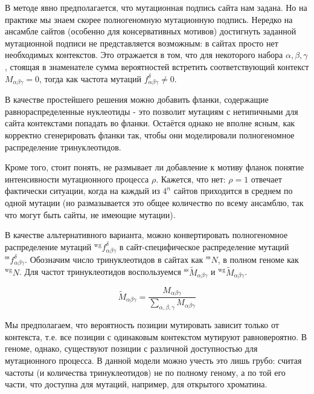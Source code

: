 \documentclass[a4paper]{article}
\begin{document}
В методе явно предполагается, что мутационная подпись сайта нам задана. Но на практике мы знаем скорее полногеномную мутационную подпись. Нередко на ансамбле сайтов (особенно для консервативных мотивов) достигнуть заданной мутационной подписи не представляется возможным: в сайтах просто нет необходимых контекстов. Это отражается в том, что для некоторого набора $\alpha, \beta, \gamma$, стоящая в знаменателе сумма вероятностей встретить соответствующий контекст $M_{\alpha\beta\gamma} = 0$, тогда как частота мутаций $f_{\alpha\beta\gamma}^{\delta}\ne 0$.

В качестве простейшего решения можно добавить фланки, содержащие равнораспределенные нуклеотиды - это позволит мутациям с нетипичными для сайта контекстами попадать во фланки. Остаётся однако не вполне ясным, как корректно сгенерировать фланки так, чтобы они моделировали полногеномное распределение тринуклеотидов.

Кроме того, стоит понять, не размывает ли добавление к мотиву фланок понятие интенсивности мутационного процесса $\rho$. Кажется, что нет: $\rho=1$ отвечает фактически ситуации, когда на каждый из $4^n$ сайтов приходится в среднем по одной мутации (но размазывается это общее количество по всему ансамблю, так что могут быть сайты, не имеющие мутации).

В качестве альтернативного варианта, можно конвертировать полногеномное распределение мутаций ${}^{\textrm{wg}}f_{\alpha\beta\gamma}^{\delta}$ в сайт-специфическое распределение мутаций ${}^{\textrm{ss}}f_{\alpha\beta\gamma}^{\delta}$. Обозначим число тринуклеотидов в сайтах как ${}^{\textrm{ss}}N$, в полном геноме как ${}^{\textrm{wg}}N$. Для частот тринуклеотидов воспользуемся ${}^{\textrm{ss}}\widetilde{M}_{\alpha\beta\gamma}$ и ${}^{\textrm{wg}}\widetilde{M}_{\alpha\beta\gamma}$.

$$\widetilde{M}_{\alpha\beta\gamma} = \frac{M_{\alpha\beta\gamma}}{\sum_{\alpha,\beta,\gamma}M_{\alpha\beta\gamma}}$$

Мы предполагаем, что вероятность позиции мутировать зависит только от контекста, т.е. все позиции с одинаковым контекстом мутируют равновероятно. В геноме, однако, существуют позиции с различной доступностью для мутационного процесса. В данной модели можно учесть это лишь грубо: считая частоты (и количества тринуклеотидов) не по полному геному, а по той его части, что доступна для мутаций, например, для открытого хроматина.
\end{document}
